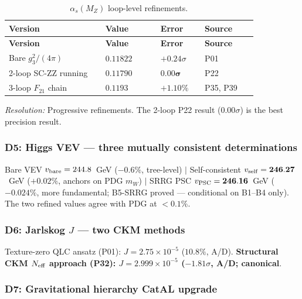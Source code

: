 \begingroup\footnotesize\renewcommand{\arraystretch}{1.2}
\begin{longtable}{@{}P{0.35\linewidth}P{0.20\linewidth}P{0.16\linewidth}P{0.19\linewidth}@{}}
\caption{$\alpha_s(M_Z)$ loop-level refinements.}\label{tab:disc-alphas}\\
\toprule
\textbf{Version} & \textbf{Value} & \textbf{Error} & \textbf{Source} \\
\midrule \endfirsthead \midrule
\textbf{Version} & \textbf{Value} & \textbf{Error} & \textbf{Source} \\
\midrule \endhead \bottomrule \endfoot
Bare $g_3^2/(4\pi)$ & $0.11822$ & $+0.24\sigma$ & P01 \\
2-loop SC-ZZ running & $\mathbf{0.11790}$ & $\mathbf{0.00\sigma}$ & P22 \\
3-loop $F_{21}$ chain & $0.1193$ & $+1.10\%$ & P35, P39 \\
\end{longtable}
\endgroup

\noindent\textit{Resolution:} Progressive refinements.
The 2-loop P22 result ($0.00\sigma$) is the best precision result.

\subsubsection*{D5: Higgs VEV — three mutually consistent determinations}

\noindent
Bare VEV $v_{\rm bare} = 244.8$~GeV ($-0.6\%$, tree-level) $|$
Self-consistent $v_{\rm self} = \mathbf{246.27}$~GeV ($\mathbf{+0.02\%}$, anchors on PDG $m_W$) $|$
SRRG PSC $v_{\rm PSC} = \mathbf{246.16}$~GeV ($\mathbf{-0.024\%}$, more fundamental; B5-SRRG proved --- conditional on B1--B4 only).
The two refined values agree with PDG at $<0.1\%$.

\subsubsection*{D6: Jarlskog $J$ — two CKM methods}

\noindent Texture-zero QLC ansatz (P01): $J = 2.75\times10^{-5}$ ($10.8\%$, A/D).
\textbf{Structural CKM $N_{\rm eff}$ approach (P32): $J = 2.999\times10^{-5}$ ($-1.81\sigma$, A/D; canonical}.

\subsubsection*{D7: Gravitational hierarchy CatAL upgrade}

